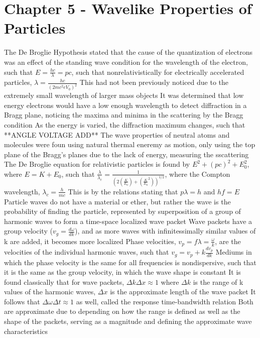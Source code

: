 \documentclass[11 pt, twoside]{article}
\newenvironment{outline*}
{
	\begin{outline}[enumerate]
	}
	{\end{outline}
}
\begin{document}
\section{Chapter 5 - Wavelike Properties of Particles}
\begin{outline*}
\1 The De Broglie Hypothesis stated that the cause of the quantization of electrons was an effect of the standing wave condition for the wavelength of the electron, such that $E = \frac{hc}{\lambda} = pc$, such that nonrelativistically for electrically accelerated particles, $\lambda = \frac{hc}{(2mc^2eV_0)^2}$
	\2 This had not been previously noticed due to the extremely small wavelength of larger mass objects
	\2 It was determined that low energy electrons would have a low enough wavelength to detect diffraction in a Bragg plane, noticing the maxima and minima in the scattering by the Bragg condition
		\3 As the energy is varied, the diffraction maximum changes, such that **ANGLE VOLTAGE ADD**
	\2 The wave properties of neutral atoms and molecules were foun using natural thermal eneremy as motion, only using the top plane of the Bragg's planes due to the lack of energy, measuring the sscattering
\1 The De Broglie equation for relativistic particles is found by $E^2 + (pc)^2 + E_0^2$, where $E = K + E_0$, such that $\frac{\lambda}{\lambda_c} = \frac{1}{(2(\frac{K}{E_0}) + (\frac{K}{E_0}^2))^{1/2}}$, where the Compton wavelength, $\lambda_c = \frac{h}{mc}$
	\2 This is by the relations stating that $p\lambda = h$ and $hf = E$
\1 Particle waves do not have a material or ether, but rather the wave is the probability of finding the particle, represented by superposition of a group of harmonic waves to form a time-space localized wave packet
	\2 Wave packets have a group velocity ($v_g = \frac{d\omega}{dk}$), and as more waves with infinitessimally similar values of k are added, it becomes more localized
		\3 Phase velocities, $v_p = f\lambda = \frac{\omega}{k}$, are the velocities of the individual harmonic waves, such that $v_g = v_p + k\frac{dv_p}{dk}$
		\3 Mediums in which the phase velocity is the same for all frequencies is nondispersive, such that it is the same as the group velocity, in which the wave shape is constant
	\2 It is found classically that for wave packets, $\Delta k \Delta x \approx 1$ where $\Delta k$ is the range of k values of the harmonic waves, $\Delta x$ is the approximate length of the wave packet
		\3 It follows that $\Delta \omega \Delta t \approx 1$ as well, called the response time-bandwidth relation
		\3 Both are approximate due to depending on how the range is defined as well as the shape of the packets, serving as a magnitude and defining the approximate wave characteristics

\end{outline*}
\end{document}
